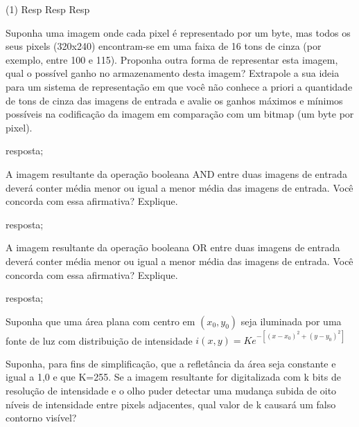 \documentclass[12pt,a4paper]{article}
\begin{document}
\begin{solution}
    \begin{tasks}(1)
        \task Resp
        \task Resp 
        \task Resp
    \end{tasks}
\end{solution}


\begin{question}{1}
Suponha uma imagem onde cada pixel é representado por um byte, mas todos os seus pixels (320x240) encontram-se em uma faixa de 16 tons de cinza (por exemplo, entre 100 e 115). Proponha outra forma de representar esta imagem, qual o possível ganho no armazenamento desta imagem? Extrapole a sua ideia para um sistema de representação em que você não conhece a priori a quantidade de tons de cinza das imagens de entrada e avalie os ganhos máximos e mínimos possíveis na codificação da imagem em comparação com um bitmap (um byte por pixel).
\end{question}

\begin{solution}
    \task resposta;
\end{solution}

\begin{question}{1}
A imagem resultante da operação booleana AND entre duas imagens de entrada deverá conter média menor ou igual a menor média das imagens de entrada. Você concorda com essa afirmativa? Explique.
\end{question}

\begin{solution}
    \task resposta;
\end{solution}

\begin{question}{1}
A imagem resultante da operação booleana OR entre duas imagens de entrada deverá conter média menor ou igual a menor média das imagens de entrada. Você concorda com essa afirmativa? Explique.
\end{question}

\begin{solution}
    \task resposta;
\end{solution}

\begin{question}{1}
Suponha que uma área plana com centro em $({x_0},{y_0})$ seja iluminada por
uma fonte de luz com distribuição de intensidade 
$i(x,y) = Ke^{-[(x-{x_0})^{2}+(y-{y_0})^{2}]}$

Suponha, para fins de simplificação, que a refletância da área seja constante e
igual a 1,0 e que K=255. Se a imagem resultante for digitalizada com k bits de
resolução de intensidade e o olho puder detectar uma mudança subida de oito
níveis de intensidade entre pixels adjacentes, qual valor de k causará um falso
contorno visível?
\end{question}
\end{document}
